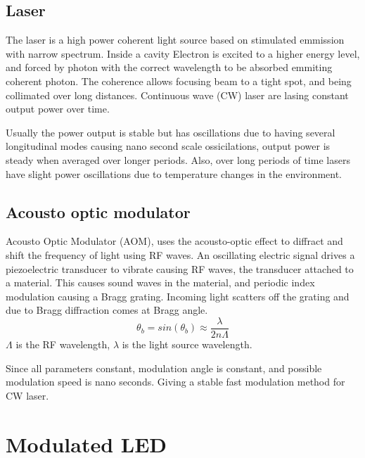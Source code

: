 \documentclass[\main/master.tex]{subfiles}
\begin{document}
\subsection{Laser}


The laser is a high power coherent light source based on stimulated emmission with narrow spectrum. Inside a cavity Electron is excited to a higher energy level, and forced by photon with the correct wavelength to be absorbed emmiting coherent photon. The coherence allows focusing beam to a tight spot, and being collimated over long distances. Continuous wave (CW) laser are lasing constant output power over time.



\par\noindent
Usually the power output is stable but has oscillations due to having several longitudinal modes causing nano second scale ossicilations, output power is steady when averaged over longer periods. Also, over long periods of time lasers have slight power oscillations due to temperature changes in the environment.

\subsection{Acousto optic modulator}
Acousto Optic Modulator (AOM), uses the acousto-optic effect to diffract and shift the frequency of light using RF waves. An oscillating electric signal drives a piezoelectric transducer to vibrate causing RF waves, the transducer attached to a material. This causes sound waves in the material, and periodic index modulation causing a Bragg grating. Incoming light scatters off the grating and due to Bragg diffraction comes at Bragg angle.
\begin{equation}
\theta_b = sin(\theta_b)\approx \frac{\lambda}{2n\Lambda} \label{eqn:energy-mass-equivalence-relation}
\end{equation} 
$\Lambda$ is the RF wavelength, $\lambda$ is the light source wavelength. 
\par\noindent
Since all parameters constant, modulation angle is constant, and possible modulation speed is nano seconds. Giving a stable fast modulation method for CW laser.


\section{Modulated LED}
\end{document}
